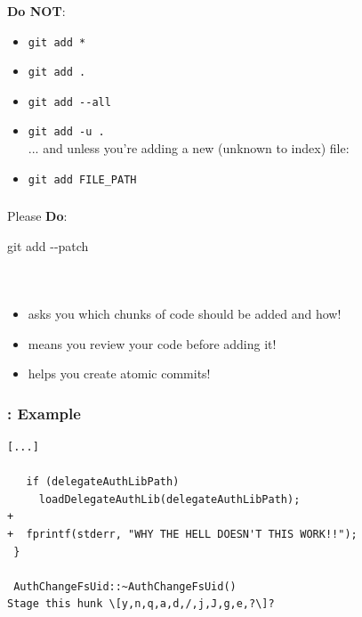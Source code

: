 \begin{frame}
  \frametitle{\insertsubsection}

  \textbf{Do NOT}:
  \begin{itemize}
    \item \texttt{git add *}
    \item \texttt{git add .}
    \item \texttt{git add -{}-all}\\
    \item \texttt{git add -u .}\\
    ... and unless you're adding a new (unknown to index) file:
    \item \texttt{git add FILE\_PATH}
  \end{itemize}
\end{frame}


\begin{frame}
  \frametitle{\insertsubsection}

  Please \textbf{Do}:\vspacing
  \begin{center}
    \Huge{git add -{}-patch}
  \end{center}
\end{frame}


\begin{frame}
  \frametitle{\insertsubsection}

  \vspace{20pt}\\

  \begin{itemize}
    \item asks you which chunks of code should be added and how!
    \item means you review your code before adding it!
    \item helps you create atomic commits!
  \end{itemize}
\end{frame}


\begin{frame}[fragile]
  \frametitle{\insertsubsection: Example}

  \begin{small}
\begin{verbatim}
[...]

   if (delegateAuthLibPath)
     loadDelegateAuthLib(delegateAuthLibPath);
+
+  fprintf(stderr, "WHY THE HELL DOESN'T THIS WORK!!");
 }

 AuthChangeFsUid::~AuthChangeFsUid()
Stage this hunk \[y,n,q,a,d,/,j,J,g,e,?\]?
\end{verbatim}
  \end{small}

\end{frame}

